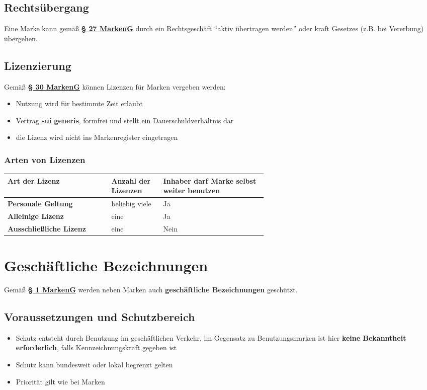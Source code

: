 \documentclass[12pt,A4]{extarticle}
\newcommand{\highlight}[1]{\textcolor{highlightColor}{\textbf{#1}}}
\newcommand{\markenG}[2][]{\textbf{\textcolor{markenGesetzLink}{\href{https://www.gesetze-im-internet.de/markeng/__#2.html}{§ #2 \ifthenelse{\equal{#1}{}}{}{#1 }MarkenG}}}}
\begin{document}
\subsection{Rechtsübergang}
Eine Marke kann gemäß \markenG{27} durch ein Rechtsgeschäft ``aktiv übertragen werden'' oder kraft Gesetzes (z.B. bei Vererbung) übergehen.

\subsection{Lizenzierung}
Gemäß \markenG{30} können Lizenzen für Marken vergeben werden:
\begin{itemize}
  \item{Nutzung wird für bestimmte Zeit erlaubt}
  \item{Vertrag \textbf{sui generis}, formfrei und stellt ein Dauerschuldverhältnis dar}
  \item{die Lizenz wird nicht ins Markenregister eingetragen}
\end{itemize}

\subsubsection{Arten von Lizenzen}
\bgroup
\def\arraystretch{1.5}
\begin{table}[h]
  \begin{tabular}{|l|p{0.2\linewidth}|p{0.4\linewidth}|}
    \hline \rowcolor{gray!30}
    Art der Lizenz                  & Anzahl der Lizenzen & Inhaber darf Marke selbst weiter benutzen \\ \hline
    \textbf{Personale Geltung}      & beliebig viele      & Ja                                        \\ \hline
    \textbf{Alleinige Lizenz}       & eine                & Ja                                        \\ \hline
    \textbf{Ausschließliche Lizenz} & eine                & Nein                                      \\ \hline
  \end{tabular}
\end{table}

\section{Geschäftliche Bezeichnungen}
Gemäß \markenG{1} werden neben Marken auch \highlight{geschäftliche Bezeichnungen} geschützt.

\subsection{Voraussetzungen und Schutzbereich}
\begin{itemize}
  \item{Schutz entsteht durch Benutzung im geschäftlichen Verkehr, im Gegensatz zu Benutzungsmarken ist hier \textbf{keine Bekanntheit erforderlich}, falls Kennzeichnungskraft gegeben ist}
  \item{Schutz kann bundesweit oder lokal begrenzt gelten}
  \item{Priorität gilt wie bei Marken}
\end{itemize}
\end{document}
